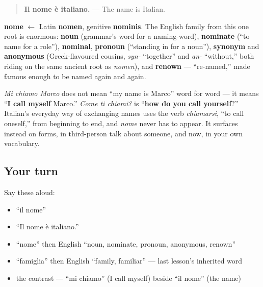 \begin{quote}
\textbf{Il nome è italiano.} — The name is Italian.
\end{quote}

\begin{cousinweb}
\textbf{nome} $\leftarrow$ Latin \textbf{nomen}, genitive \textbf{nominis}. The English family from this one root is enormous: \textbf{noun} (grammar's word for a naming-word), \textbf{nominate} (\textquotedblleft{}to name for a role\textquotedblright{}), \textbf{nominal}, \textbf{pronoun} (\textquotedblleft{}standing in for a noun\textquotedblright{}), \textbf{synonym} and \textbf{anonymous} (Greek-flavoured cousins, \emph{syn-} \textquotedblleft{}together\textquotedblright{} and \emph{an-} \textquotedblleft{}without,\textquotedblright{} both riding on the same ancient root as \emph{nomen}), and \textbf{renown} — \textquotedblleft{}re-named,\textquotedblright{} made famous enough to be named again and again.
\end{cousinweb}

\begin{culture}
\emph{Mi chiamo Marco} does not mean \textquotedblleft{}my name is Marco\textquotedblright{} word for word — it means \textquotedblleft{}\textbf{I call myself} Marco.\textquotedblright{} \emph{Come ti chiami?} is \textquotedblleft{}\textbf{how do you call yourself}?\textquotedblright{} Italian's everyday way of exchanging names uses the verb \emph{chiamarsi}, \textquotedblleft{}to call oneself,\textquotedblright{} from beginning to end, and \emph{nome} never has to appear. It surfaces instead on forms, in third-person talk about someone, and now, in your own vocabulary.
\end{culture}

\subsection*{Your turn}
Say these aloud:

\begin{itemize}
\raggedright
  \item \textquotedblleft{}il nome\textquotedblright{}
  \item \textquotedblleft{}Il nome è italiano.\textquotedblright{}
  \item \textquotedblleft{}nome\textquotedblright{} then English \textquotedblleft{}noun, nominate, pronoun, anonymous, renown\textquotedblright{}
  \item \textquotedblleft{}famiglia\textquotedblright{} then English \textquotedblleft{}family, familiar\textquotedblright{} — last lesson's inherited word
  \item the contrast — \textquotedblleft{}mi chiamo\textquotedblright{} (I call myself) beside \textquotedblleft{}il nome\textquotedblright{} (the name)
\end{itemize}

